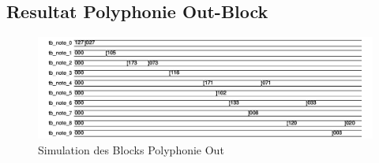 \subsection{Resultat Polyphonie Out-Block}

\begin{figure}[H]
	\centering
	\includegraphics[width=1\textwidth]{images/midi_interface/tb_polyphonie.png}
	\caption{Simulation des Blocks Polyphonie Out }
	\label{fig.polyphnie_simulation}
\end{figure}